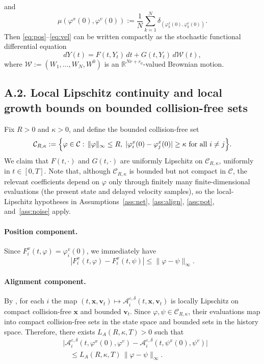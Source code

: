 \documentclass[pdflatex,sn-mathphys-num]{sn-jnl}%
\numberwithin{equation}{section}
\theoremstyle{thmstyleone}%
\theoremstyle{remark}
\theoremstyle{definition}
\newcommand{\R}{\mathbb{R}}
\begin{document}
and
\[
  \mu(\varphi^x(0),\varphi^v(0))
  :=
  \frac1N\sum_{k=1}^N \delta_{(\varphi_k^x(0),\varphi_k^v(0))}.
\]
Then \eqref{eq:pos}--\eqref{eq:vel} can be written compactly as the
stochastic functional differential equation
\begin{equation}\label{eq:appendix-sfde}
  dY(t)=F(t,Y_t)\,dt+G(t,Y_t)\,d\mathcal W(t),
\end{equation}
where $\mathcal W:=(W_1,\dots,W_N,W^0)$ is an $\R^{Nr+r_0}$-valued
Brownian motion.
\subsection*{A.2. Local Lipschitz continuity and local growth bounds on bounded collision-free sets}
Fix $R>0$ and $\kappa>0$, and define the bounded collision-free set
\begin{equation*}
\begin{aligned}
  \mathcal C_{R,\kappa}
  := \Bigl\{ \varphi\in\mathcal C:\,
    \|\varphi\|_\infty\le R,\; 
    |\varphi_i^x(0)-\varphi_j^x(0)|\ge \kappa
    \text{ for all }i\neq j \Bigr\}.
\end{aligned}
\end{equation*}
We claim that $F(t,\cdot)$ and $G(t,\cdot)$ are uniformly Lipschitz on
$\mathcal C_{R,\kappa}$, uniformly in $t\in[0,T]$. Note that, although
$\mathcal C_{R,\kappa}$ is bounded but not compact in $\mathcal C$, the
relevant coefficients depend on $\varphi$ only through finitely many
finite-dimensional evaluations (the present state and delayed velocity
samples), so the local-Lipschitz hypotheses in Assumptions~\ref{ass:net}, \ref{ass:align}, \ref{ass:pot}, and~\ref{ass:noise} apply.
\paragraph{Position component.}
Since $F_i^x(t,\varphi)=\varphi_i^v(0)$, we immediately have
\[
  |F_i^x(t,\varphi)-F_i^x(t,\psi)|
  \le \|\varphi-\psi\|_\infty.
\]
\paragraph{Alignment component.}
By , for each $i$ the map
$(t,\mathbf{x},\mathbf{v}_t)\mapsto \mathcal A_i^{\varepsilon,\delta}(t,\mathbf{x},\mathbf{v}_t)$
is locally Lipschitz on compact collision-free $\mathbf{x}$ and bounded $\mathbf{v}_t$.
Since $\varphi, \psi \in \mathcal C_{R,\kappa}$, their evaluations map into
compact collision-free sets in the state space and bounded sets in the
history space. Therefore, there exists $L_{A}(R,\kappa,T)>0$ such that
\begin{equation*}
\begin{aligned}
  &\bigl| \mathcal A_i^{\varepsilon,\delta}(t,\varphi^x(0),\varphi^v)
    - \mathcal A_i^{\varepsilon,\delta}(t,\psi^x(0),\psi^v) \bigr| \\
  &\quad \le L_A(R,\kappa,T)\,\|\varphi-\psi\|_\infty.
\end{aligned}
\end{equation*}
\end{document}
